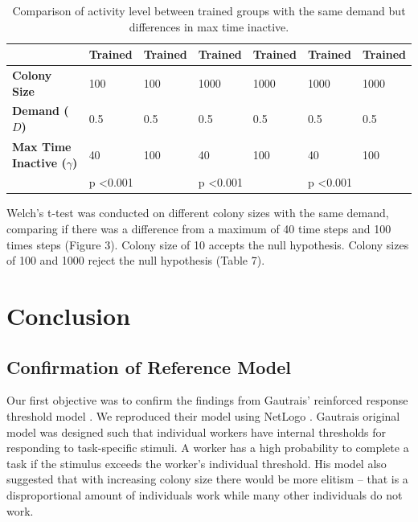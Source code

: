 \documentclass[a4paper]{article}
\begin{document}
\begin{table}[H]
\caption{Comparison of activity level between trained groups with the same demand but differences in max time inactive.}
\begin{tabular}{|l|l|l|l|l|l|l|}
\hline
                           & \textbf{Trained}   & \textbf{Trained}  & \textbf{Trained}   & \textbf{Trained}  & \textbf{Trained}   & \textbf{Trained}  \\ \hline
\textbf{Colony Size}       & 100                & 100               & 1000               & 1000              & 1000               & 1000              \\ \hline
\textbf{Demand ($D$)}            & 0.5                & 0.5               & 0.5                & 0.5               & 0.5                & 0.5               \\ \hline
\textbf{Max Time Inactive ($\gamma$)} & 40                 & 100               & 40                 & 100               & 40                 & 100               \\ \hline
                           & \multicolumn{2}{l|}{p \textless 0.001} & \multicolumn{2}{l|}{p \textless 0.001} & \multicolumn{2}{l|}{p \textless 0.001} \\ \hline
\end{tabular}
\end{table}

Welch’s t-test was conducted on different colony sizes with the same demand, comparing if there was a difference from a maximum of 40 time steps and 100 times steps (Figure 3).  Colony size of 10 accepts the null hypothesis.  Colony sizes of 100 and 1000 reject the null hypothesis (Table 7).  

\section{Conclusion}

\subsection{Confirmation of Reference Model}

Our first objective was to confirm the findings from Gautrais’ reinforced response threshold model \cite{Gautrais}.  We reproduced their model using NetLogo \cite{Netlogo}.  Gautrais original model was designed such that individual workers have internal thresholds for responding to task-specific stimuli.  A worker has a high probability to complete a task if the stimulus exceeds the worker’s individual threshold.  His model also suggested that with increasing colony size there would be more elitism – that is a disproportional amount of individuals work while many other individuals do not work.\\  
\end{document}
